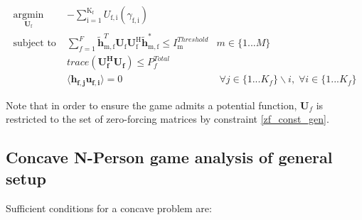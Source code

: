 \documentclass[12pt,a4paper]{report}
\begin{document}
	\begin{subequations}
	\label{optim}
	\begin{align}
	    \underset{\mathbf{U}_{\mathrm{f}} }{\text{argmin}} \;
	    & - \sum_{\mathrm{i=1}}^{\mathrm{K_f}}
    	U_{\mathrm{f,i}}(\gamma_{\mathrm{f,i}}) \label{player_opt} \\
	    \text{subject to} \; &
	   \sum^F_{f=1} \mathbf{\tilde{h}}_{\mathrm{m,f}}^T  \mathbf{U_{\mathrm{f}}}		
	\mathbf{U_{\mathrm{f}}^{\mathrm{H}}} \mathbf{\tilde{h}_{\mathrm{m,f}}^*} \leq I^{Threshold}		
	_{\mathrm{m}} & m \in \{1 ...M\} 
		\label{interference_const_gen}\\
        & trace(\mathbf{U_f^H}\mathbf{U_f}) \leq P^{Total}_{f} \label{power_const_gen}\\
        & \langle \mathbf{h_{f,j}}\mathbf{u_{f,i}} \rangle =0\ & \; \forall j \in \{1... K_f\}\backslash i ,\; \forall i \in \{1 ... K_f\} \label{zf_const_gen}
	\end{align}
	\end{subequations}
	
Note that in order to ensure the game admits a potential function, $\mathbf{U}_f$ is restricted to the set of zero-forcing matrices by constraint \eqref{zf_const_gen}.	
	
\subsection{Concave N-Person game analysis of general setup}

Sufficient conditions for a concave problem are:
\end{document}
